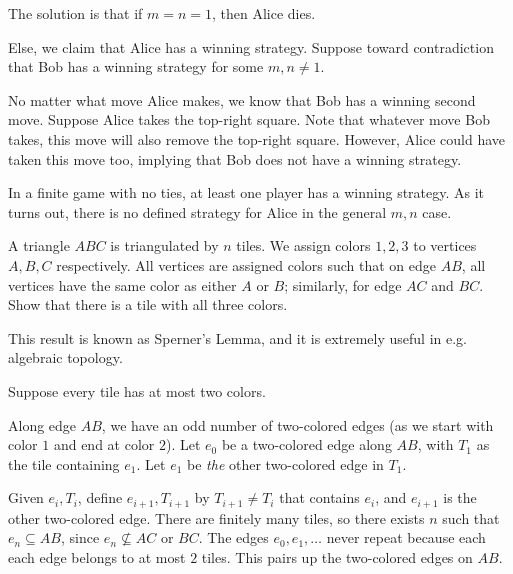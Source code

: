 \documentclass[10pt]{mypackage}
\begin{document}
\begin{solution}
  The solution is that if $m=n=1$, then Alice dies.\newline

  Else, we claim that Alice has a winning strategy. Suppose toward contradiction that Bob has a winning strategy for some $m,n\neq 1$.\newline

  No matter what move Alice makes, we know that Bob has a winning second move. Suppose Alice takes the top-right square. Note that whatever move Bob takes, this move will also remove the top-right square. However, Alice could have taken this move too, implying that Bob does not have a winning strategy.
\end{solution}
\begin{remark}
  In a finite game with no ties, at least one player has a winning strategy. As it turns out, there is no defined strategy for Alice in the general $m,n$ case.
\end{remark}
\begin{problem}
  A triangle $ABC$ is triangulated by $n$ tiles. We assign colors $1,2,3$ to vertices $A,B,C$ respectively. All vertices are assigned colors such that on edge $AB$, all vertices have the same color as either $A$ or $B$; similarly, for edge $AC$ and $BC$. Show that there is a tile with all three colors.
\end{problem}
\begin{remark}
This result is known as Sperner's Lemma, and it is extremely useful in e.g. algebraic topology.
\end{remark}
\begin{solution}
  Suppose every tile has at most two colors.\newline

  Along edge $AB$, we have an odd number of two-colored edges (as we start with color $1$ and end at color $2$). Let $e_0$ be a two-colored edge along $AB$, with $T_1$ as the tile containing $e_1$. Let $e_1$ be \textit{the} other two-colored edge in $T_1$.\newline

  Given $e_i,T_i$, define $e_{i+1},T_{i+1}$ by $T_{i+1}\neq T_i$ that contains $e_{i}$, and $e_{i+1}$ is the other two-colored edge. There are finitely many tiles, so there exists $n$ such that $e_{n}\subseteq AB$, since $e_n\nsubseteq AC$ or $BC$. The edges $e_0,e_1,\dots$ never repeat because each each edge belongs to at most $2$ tiles. This pairs up the two-colored edges on $AB$.
\end{solution}
\end{document}
